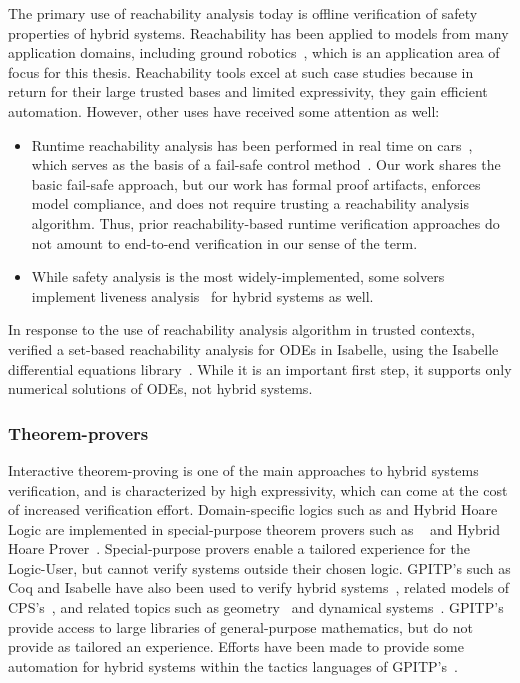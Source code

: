\documentclass[12pt]{cmuthesis}
\theoremstyle{definition}
\theoremstyle{remark}
\begin{document}
The primary use of reachability analysis today is offline verification of safety properties of hybrid systems.
Reachability has been applied to models from many application domains, including ground robotics~\cite{chen2015benchmark}, which is an application area of focus for this thesis.
Reachability tools excel at such case studies because in return for their large trusted bases and limited expressivity, they gain efficient automation.
However, other uses have received some attention as well:
\begin{itemize}
\item
Runtime reachability analysis has been performed in real time on cars~\cite{DBLP:journals/trob/AlthoffD14}, which serves as the basis of a fail-safe control method~\cite{DBLP:conf/icra/PereiraA15}.
Our work shares the basic fail-safe approach, but our work has formal proof artifacts, enforces model compliance, and does not require trusting a reachability analysis algorithm.
Thus, prior reachability-based runtime verification approaches do not amount to end-to-end verification in our sense of the term.
\item While safety analysis is the most widely-implemented, some solvers~\cite{DBLP:conf/tacas/CimattiGMT15} implement liveness analysis~\cite{DBLP:conf/cav/CimattiGMT14} for hybrid systems as well.
\end{itemize}
In response to the use of reachability analysis algorithm in trusted contexts, \cite{DBLP:conf/tacas/Immler15} verified a set-based reachability analysis for ODEs in Isabelle, using the Isabelle differential equations library~\cite{DBLP:conf/itp/ImmlerT16}.
While it is an important first step, it supports only numerical solutions of ODEs, not hybrid systems.


\subsubsection{Theorem-provers}
Interactive theorem-proving is one of the main approaches to hybrid systems verification, and is characterized by high expressivity, which can come at the cost of increased verification effort.
Domain-specific logics such as \dGL and Hybrid Hoare Logic are implemented in special-purpose theorem provers such as \KeYmaeraX~\cite{DBLP:conf/cade/FultonMQVP15} and Hybrid Hoare Prover~\cite{DBLP:conf/aplas/LiuLQZZZZ10}.
Special-purpose provers enable a tailored experience for the Logic-User, but cannot verify systems outside their chosen logic.
GPITP's such as Coq and Isabelle have also been used to verify hybrid systems~\cite{DBLP:conf/cpp/Rouhling18,DBLP:conf/utp/Foster19}, related models of CPS's~\cite{DBLP:conf/atva/RizaldiISA18,DBLP:conf/ifm/RizaldiKHFIAHN17,chan2016formal}, and related topics such as geometry~\cite{DBLP:conf/cpp/AffeldtC17} and dynamical systems~\cite{DBLP:conf/itp/CohenR17}.
GPITP's provide access to large libraries of general-purpose mathematics, but do not provide as tailored an experience.
Efforts have been made to provide some automation for hybrid systems within the tactics languages of GPITP's~\cite{DBLP:conf/utp/Foster19}.
\end{document}
